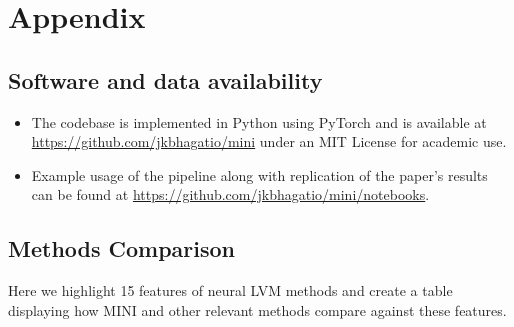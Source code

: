 \section{Appendix}

\subsection{Software and data availability}
\label{subsection:software_data_availability}

\begin{itemize}

    \item The codebase is implemented in Python using PyTorch and is available at \url{https://github.com/jkbhagatio/mini} under an MIT License for academic use.
    
    \item Example usage of the pipeline along with replication of the paper's results can be found at \url{https://github.com/jkbhagatio/mini/notebooks}.

\end{itemize}







\subsection{Methods Comparison}

Here we highlight 15 features of neural LVM methods and create a table displaying how MINI and other relevant methods compare against these features.

